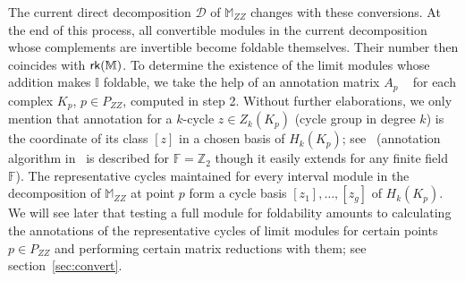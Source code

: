 \documentclass[11pt]{article}
\theoremstyle{plain}%
\newcommand{\Int}{\mathbb{I}}
\newcommand{\M}{\mathbb{M}}
\newcommand{\D}{\mathcal{D}}
\newcommand{\Z}{\mathbb{Z}}
\newcommand{\rk}{{\sf{rk}}}
\begin{document}
The current direct decomposition $\D$ of $\M_{ZZ}$ changes with these conversions.
At the end of this process, all convertible modules in the current
decomposition whose complements are invertible become foldable themselves.
Their number then coincides with $\rk(\M)$.
To determine the existence of the limit modules whose addition makes $\Int$
foldable, we take the help of an annotation matrix $A_p$ ~\cite[Chaper 4]{DW22} 
for each complex $K_p$, $p\in P_{ZZ}$, computed in step 2.
Without further elaborations, we only mention that annotation
for a $k$-cycle $z\in Z_k(K_p)$ (cycle group in degree $k$) 
is the coordinate of its class $[z]$
in a chosen basis of $H_k(K_p)$; see~\cite{BCCDW12} (annotation algorithm
in~\cite{BCCDW12} is described for $\mathbb{F}=\Z_2$ though it easily extends
for any finite field $\mathbb{F}$).
The representative cycles maintained for every interval module
in the decomposition of $\M_{ZZ}$ at point $p$ form a cycle basis $[z_1],\ldots,[z_g]$ 
of $H_k(K_p)$. We will see later
that testing a full module for foldability amounts to
calculating the annotations of the representative cycles of limit
modules for certain points $p\in P_{ZZ}$ and performing certain matrix
reductions with them; see section~\ref{sec:convert}.\\
\end{document}
